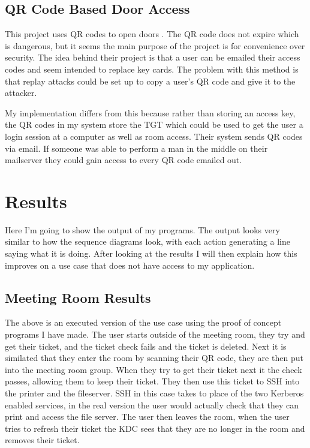 \documentclass[]{report}   %
\begin{document}
\subsection{QR Code Based Door Access}
This project uses QR codes to open doors \cite{QRRelated}. The QR code does not expire which is dangerous, but it seems the main purpose of the project is for convenience over security. The idea behind their project is that a user can be emailed their access codes and seem intended to replace key cards. The problem with this method is that replay attacks could be set up to copy a user's QR code and give it to the attacker.

My implementation differs from this because rather than storing an access key, the QR codes in my system store the TGT which could be used to get the user a login session at a computer as well as room access. Their system sends QR codes via email. If someone was able to perform a man in the middle on their mailserver they could gain access to every QR code emailed out.


\section{Results}
Here I'm going to show the output of my programs. The output looks very similar to how the sequence diagrams look, with each action generating a line saying what it is doing. After looking at the results I will then explain how this improves on a use case that does not have access to my application.

\subsection{Meeting Room Results}
The above is an executed version of the use case using the proof of concept programs I have made. The user starts outside of the meeting room, they try and get their ticket, and the ticket check fails and the ticket is deleted. Next it is similated that they enter the room by scanning their QR code, they are then put into the meeting room group. When they try to get their ticket next it the check passes, allowing them to keep their ticket. They then use this ticket to SSH into the printer and the fileserver. SSH in this case takes to place of the two Kerberos enabled services, in the real version the user would actually check that they can print and access the file server. The user then leaves the room, when the user tries to refresh their ticket the KDC sees that they are no longer in the room and removes their ticket.
\end{document}
